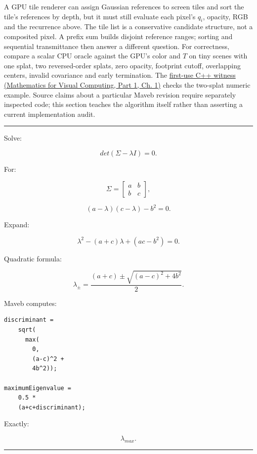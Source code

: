 A GPU tile renderer can assign Gaussian references to screen tiles and sort the tile's references by depth, but it must still evaluate each pixel's \(q_i\), opacity, RGB and the recurrence above. The tile list is a conservative candidate structure, not a composited pixel. A prefix sum builds disjoint reference ranges; sorting and sequential transmittance then answer a different question. For correctness, compare a scalar CPU oracle against the GPU's color and \(T\) on tiny scenes with one splat, two reversed-order splats, zero opacity, footprint cutoff, overlapping centers, invalid covariance and early termination. The \href{../02-Mathematics-for-Visual-Computing-P01/main.pdf\#nameddest=source-file-a41016f2e326b40cdff18ff4}{first-use C++ witness (Mathematics for Visual Computing, Part 1, Ch. 1)} checks the two-splat numeric example. Source claims about a particular Maveb revision require separately inspected code; this section teaches the algorithm itself rather than asserting a current implementation audit.

\begin{center}\rule{0.5\linewidth}{0.5pt}\end{center}

Solve:

\[
det(
\Sigma-\lambda I
)
=0.
\]

For:

\[
\Sigma=
\begin{bmatrix}
a&b\\
b&c
\end{bmatrix},
\]

\[
(a-\lambda)
(c-\lambda)
-b^2=0.
\]

Expand:

\[
\lambda^2
-
(a+c)\lambda
+
(ac-b^2)
=0.
\]

Quadratic formula:

\[
\boxed{
\lambda_{\pm}
=
\frac{
(a+c)
\pm
\sqrt{
(a-c)^2+4b^2
}
}{2}.
}
\]

Maveb computes:

\begin{verbatim}
discriminant =
    sqrt(
      max(
        0,
        (a-c)^2 +
        4b^2));

maximumEigenvalue =
    0.5 *
    (a+c+discriminant);
\end{verbatim}

Exactly:

\[
\lambda_{max}.
\]

\begin{center}\rule{0.5\linewidth}{0.5pt}\end{center}

